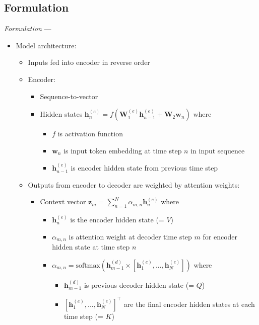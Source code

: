 \subsection*{Formulation}
\emph{Formulation} --- 
\begin{itemize}
    \item Model architecture: 
    \begin{itemize}
        \item Inputs fed into encoder in reverse order
        \item Encoder: 
        \begin{itemize}
            \item Sequence-to-vector
            \item Hidden states $\boldsymbol{h}_n^{(e)} = f ( \boldsymbol{W}_1^{(e)} \boldsymbol{h}_{n-1}^{(e)} + \boldsymbol{W}_2 \boldsymbol{w}_{n} )$ where 
            \begin{itemize}
                \item $f$ is activation function
                \item $\boldsymbol{w}_{n}$ is input token embedding at time step $n$ in input sequence
                \item $\boldsymbol{h}_{n-1}^{(e)}$ is encoder hidden state from previous time step
            \end{itemize}
        \end{itemize}
        \item Outputs from encoder to decoder are weighted by attention weights:
        \begin{itemize}
            \item Context vector $\boldsymbol{z}_m = \sum_{n=1}^N \alpha_{m,n} \boldsymbol{h}_n^{(e)}$ where 
            \begin{itemize}
                \item $\boldsymbol{h}_n^{(e)}$ is the encoder hidden state (= $V$)
                \item $\alpha_{m,n}$ is attention weight at decoder time step $m$ for encoder hidden state at time step $n$
                \item $\alpha_{m,n} = \textrm{softmax}(\boldsymbol{h}_{m-1}^{(d)} \times [\boldsymbol{h}_1^{(e)}, ..., \boldsymbol{h}_N^{(e)}])$ where
                \begin{itemize}
                    \item $\boldsymbol{h}_{m-1}^{(d)}$ is previous decoder hidden state (= $Q$)
                    \item $[\boldsymbol{h}_1^{(e)}, ..., \boldsymbol{h}_N^{(e)}]^\intercal$ are the final encoder hidden states at each time step (= $K$)

\end{itemize}
\end{itemize}
\end{itemize}
\end{itemize}
\end{itemize}
